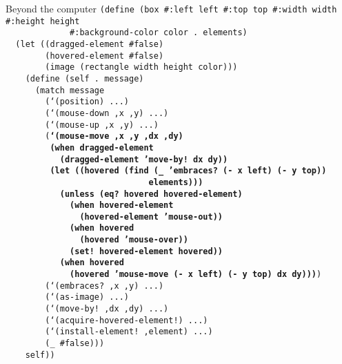 \begin{frame}{Beyond the computer}
  \tiny
  \texttt{(define (box \#:left left \#:top top \#:width width \#:height height\\
    \ \ \ \ \ \ \ \ \ \ \ \ \ \#:background-color color .\ elements)\\
    \ \ (let ((dragged-element \#false)\\
    \ \ \ \ \ \ \ \ (hovered-element \#false)\\
    \ \ \ \ \ \ \ \ (image (rectangle width height color)))\\
    \ \ \ \ (define (self .\ message)\\
    \ \ \ \ \ \ (match message\\
    \ \ \ \ \ \ \ \ (`(position) ...)\\
    \ \ \ \ \ \ \ \ (`(mouse-down ,x ,y) ...)\\
    \ \ \ \ \ \ \ \ (`(mouse-up ,x ,y) ...)\\
    \ \ \ \ \ \ \ \ (\textbf{`(mouse-move ,x ,y ,dx ,dy)\\
    \ \ \ \ \ \ \ \ \ (when dragged-element\\
    \ \ \ \ \ \ \ \ \ \ \ (dragged-element 'move-by!\ dx dy))\\
    \ \ \ \ \ \ \ \ \ (let ((hovered (find (\_ 'embraces?\ (- x left) (- y top))\\
    \ \ \ \ \ \ \ \ \ \ \ \ \ \ \ \ \ \ \ \ \ \ \ \ \ \ \ \ \ elements)))\\
    \ \ \ \ \ \ \ \ \ \ \ (unless (eq?\ hovered hovered-element)\\
    \ \ \ \ \ \ \ \ \ \ \ \ \ (when hovered-element\\
    \ \ \ \ \ \ \ \ \ \ \ \ \ \ \ (hovered-element 'mouse-out))\\
    \ \ \ \ \ \ \ \ \ \ \ \ \ (when hovered\\
    \ \ \ \ \ \ \ \ \ \ \ \ \ \ \ (hovered 'mouse-over))\\
    \ \ \ \ \ \ \ \ \ \ \ \ \ (set!\ hovered-element hovered))\\
    \ \ \ \ \ \ \ \ \ \ \ (when hovered\\
    \ \ \ \ \ \ \ \ \ \ \ \ \ (hovered 'mouse-move (- x left) (- y top) dx dy)))})\\
    \ \ \ \ \ \ \ \ (`(embraces?\ ,x ,y) ...)\\
    \ \ \ \ \ \ \ \ (`(as-image) ...)\\
    \ \ \ \ \ \ \ \ (`(move-by!\ ,dx ,dy) ...)\\
    \ \ \ \ \ \ \ \ (`(acquire-hovered-element!) ...)\\
    \ \ \ \ \ \ \ \ (`(install-element!\ ,element) ...)\\
    \ \ \ \ \ \ \ \ (\_ \#false)))\\
    \ \ \ \ self))}
\end{frame}

